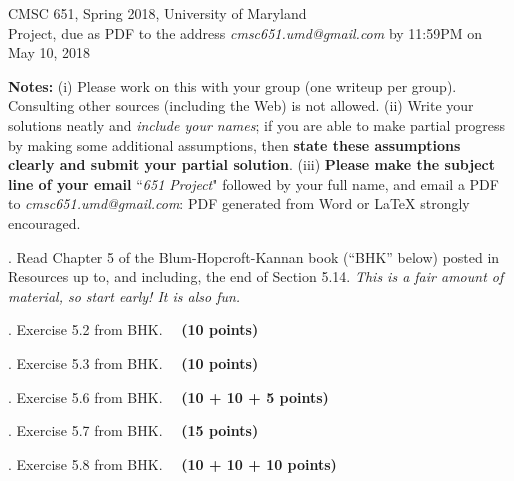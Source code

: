 \documentclass{article}[11pt]
\begin{document}
\newcommand{\E}{\textbf{E}}
\newcommand{\var}{\textbf{var}}

\begin{center}
CMSC 651, Spring 2018, University of Maryland \\
Project, due as PDF to the address \emph{cmsc651.umd@gmail.com} by 11:59PM on May 10, 2018
\end{center}

\medskip \noindent
\textbf{Notes:} (i) Please work on this with your group (one writeup per group). Consulting
other sources (including the Web) is not allowed. 
(ii) Write your solutions neatly and \emph{include your names}; if you are able to make partial progress by making some
additional assumptions, then \textbf{state these assumptions clearly and submit
your partial solution}. 
(iii) \textbf{Please make the subject line of your email} ``\textit{651 Project}" followed by
your full name, and email a PDF to \emph{cmsc651.umd@gmail.com}: PDF generated from Word or LaTeX strongly encouraged. 



\medskip \smallskip {}. Read Chapter 5 of the Blum-Hopcroft-Kannan book (``BHK'' below) posted in Resources up to, and including, the end of Section 5.14. \emph{This is a fair amount of material, so start early! It is also fun.} 

\medskip {}.  Exercise 5.2 from BHK. ~~\textbf{(10 points)} 


\medskip {}.  Exercise 5.3 from BHK. ~~\textbf{(10 points)} 


\medskip {}.  Exercise 5.6 from BHK. ~~\textbf{(10 + 10 + 5 points)} 


\medskip {}.  Exercise 5.7 from BHK. ~~\textbf{(15 points)} 

\medskip {}.  Exercise 5.8 from BHK. ~~\textbf{(10 + 10 + 10 points)} 
\end{document}
